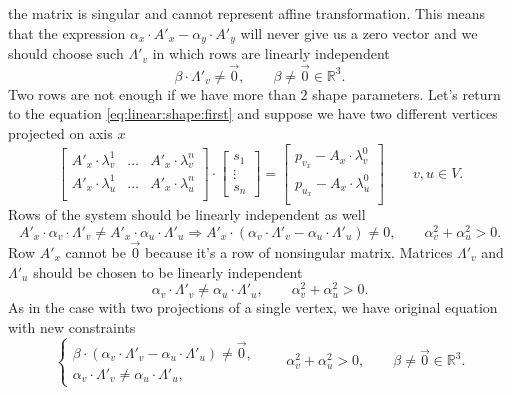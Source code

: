 the matrix is singular and cannot represent affine transformation.
This means that the expression $\alpha_x \cdot A'_x - \alpha_y \cdot A'_y$
will never give us a zero vector and we should choose such $\Lambda'_v$
in which rows are linearly independent
\begin{equation*}
  \beta \cdot \Lambda'_v \neq \vec{0},
  \qquad \beta \neq \vec{0} \in \mathbb{R}^3.
\end{equation*}
Two rows are not enough if we have more than $2$ shape parameters.
Let's return to the equation \eqref{eq:linear:shape:first}
and suppose we have two different vertices projected on axis $x$
\begin{equation*}
  \begin{bmatrix}
    A'_x \cdot \lambda^1_v & \dots & A'_x \cdot \lambda^n_v \\
    A'_x \cdot \lambda^1_u & \dots & A'_x \cdot \lambda^n_u \\
  \end{bmatrix}
  \cdot \begin{bmatrix}
    s_1 \\
    \vdots \\
    s_n
  \end{bmatrix}
  = \begin{bmatrix}
    p_{v_x} - A_x \cdot \lambda^0_v \\
    p_{u_x} - A_x \cdot \lambda^0_u \\
  \end{bmatrix}
  \qquad v, u \in V.
\end{equation*}
Rows of the system should be linearly independent as well
\begin{equation*}
  A'_x \cdot \alpha_v \cdot \Lambda'_v \neq A'_x \cdot \alpha_u \cdot \Lambda'_u
  \Rightarrow
  A'_x \cdot \left( \alpha_v \cdot \Lambda'_v
                  - \alpha_u \cdot \Lambda'_u \right)
    \neq 0,
  \qquad \alpha_v^2 + \alpha_u^2 > 0.
\end{equation*}
Row $A'_x$ cannot be $\vec{0}$ because it's a row of nonsingular matrix.
Matrices $\Lambda'_v$ and $\Lambda'_u$
should be chosen to be linearly independent
\begin{equation*}
  \alpha_v \cdot \Lambda'_v \neq \alpha_u \cdot \Lambda'_u,
  \qquad \alpha_v^2 + \alpha_u^2 > 0.
\end{equation*}
As in the case with two projections of a single vertex,
we have original equation with new constraints
\begin{equation*}
  \begin{cases}
    \beta \cdot \left( \alpha_v \cdot \Lambda'_v
                     - \alpha_u \cdot \Lambda'_u \right)
    \neq \vec{0}, \\
    \alpha_v \cdot \Lambda'_v \neq \alpha_u \cdot \Lambda'_u,
  \end{cases}
  \qquad \alpha_v^2 + \alpha_u^2 > 0,
  \qquad \beta \neq \vec{0} \in \mathbb{R}^3.
\end{equation*}
